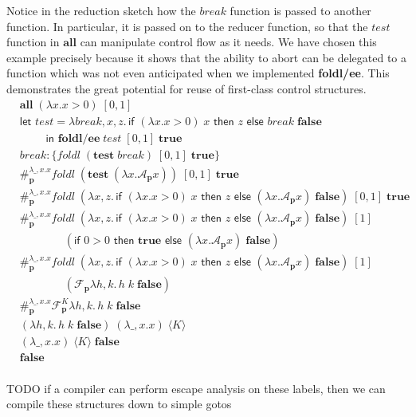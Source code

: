 \documentclass[11pt]{article}
\newcommand\x{\lambda x}
\newcommand{\letin}[2]{\textsf{let }#1\textsf{ in }#2}
\newcommand\F{\mathcal{F}}
\newcommand\A{\mathcal{A}}
\newcommand{\angles}[1]{\langle#1\rangle}
\begin{document}
Notice in the reduction sketch how the $break$ function is passed to another function.
In particular, it is passed on to the reducer function, so that the $test$ function in $\textbf{all}$ can manipulate control flow as it needs.
We have chosen this example precisely because it shows that the ability to abort can be delegated to a function which was not even anticipated when we implemented \textbf{foldl/ee}.
This demonstrates the great potential for reuse of first-class control structures.
\begin{align*}
&\textbf{all}\;(\x.x>0)\;[0, 1] \\
%
&\letin{test =
	\lambda break,x,z.\,\textsf{if }(\x.x>0)\;x
	\textsf{ then }z\textsf{ else }break\;\textbf{false}
\\&\qquad}{\textbf{foldl/ee}\;test\;[0,1]\;\textbf{true}} \\
%
&break\!: \{foldl\;(\textbf{test}\;break)\;[0,1]\;\textbf{true}\} \\
%
&\#_\textbf{p}^{\lambda\_,x.x}
	foldl\;(\textbf{test}\;(\x.\A_\textbf{p}x))\;[0,1]\;\textbf{true} \\
%
&\#_\textbf{p}^{\lambda\_,x.x}
	foldl\;(\x,z.\,\textsf{if }(\x.x>0)\;x
	\textsf{ then }z\textsf{ else }(\x.\A_\textbf{p}x)\;\textbf{false})\;[0,1]\;\textbf{true} \\
%
&\#_\textbf{p}^{\lambda\_,x.x}
	foldl\;(\x,z.\,\textsf{if }(\x.x>0)\;x
	\textsf{ then }z\textsf{ else }(\x.\A_\textbf{p}x)\;\textbf{false})\;[1] \\
		&\qquad\qquad(\textsf{if }0>0\textsf{ then }\textbf{true}\textsf{ else }(\x.\A_\textbf{p}x)\;\textbf{false}) \\
%
&\#_\textbf{p}^{\lambda\_,x.x}
	foldl\;(\x,z.\,\textsf{if }(\x.x>0)\;x
	\textsf{ then }z\textsf{ else }(\x.\A_\textbf{p}x)\;\textbf{false})\;[1] \\
		&\qquad\qquad(\F_\textbf{p}\lambda h,k.\,h\;k\;\textbf{false}) \\
%
&\#_\textbf{p}^{\lambda\_,x.x}\F_\textbf{p}^K\lambda h,k.\,h\;k\;\textbf{false} \\
%
&(\lambda h,k.\,h\;k\;\textbf{false})\;(\lambda\_,x.x)\;\angles K \\
%
&(\lambda\_,x.x)\;\angles K\;\textbf{false} \\
%
&\textbf{false} \\
\end{align*}


TODO if a compiler can perform escape analysis on these labels, then we can compile these structures down to simple gotos
\end{document}
